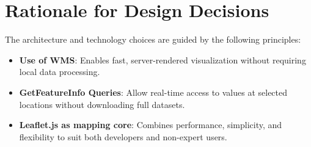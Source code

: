 \section{Rationale for Design Decisions}
The architecture and technology choices are guided by the following principles:
\begin{itemize}
	\item \textbf{Use of WMS}: Enables fast, server-rendered visualization without requiring local data processing.
	\item \textbf{GetFeatureInfo Queries}: Allow real-time access to values at selected locations without downloading full datasets.
	\item \textbf{Leaflet.js as mapping core}: Combines performance, simplicity, and flexibility to suit both developers and non-expert users.
\end{itemize}